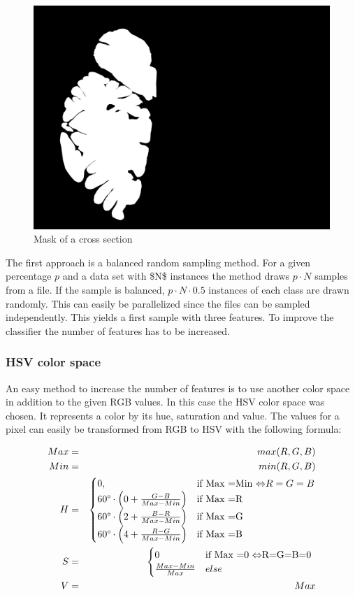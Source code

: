 \begin{figure}	
\centering 	
\includegraphics[width=0.6\linewidth]{graphics/mask603} 	
\caption{Mask of a cross section} 	
\label{fig:mask603} 
\end{figure}

The first approach is a balanced random sampling method. For a given
percentage $p$ and a data set with \$N\$ instances the method draws
$p\cdot N$ samples from a file. If the sample is balanced, $p\cdot N\cdot0.5$
instances of each class are drawn randomly. This can easily be parallelized
since the files can be sampled independently. This yields a first
sample with three features. To improve the classifier the number of
features has to be increased.


\subsubsection{HSV color space}

An easy method to increase the number of features is to use another
color space in addition to the given RGB values. In this case the
HSV color space was chosen. It represents a color by its hue, saturation
and value. The values for a pixel can easily be transformed from RGB
to HSV with the following formula:

\begin{eqnarray*}
Max & = & max(R,G,B)\\
Min & = & min(R,G,B)\\
H & = & \begin{cases}
0, & \text{if Max =Min \ensuremath{\Leftrightarrow}}R=G=B\\
60\text{\textdegree}\cdot\left(0+\frac{G-B}{Max-Min}\right) & \text{if Max =R }\\
60\text{\textdegree}\cdot\left(2+\frac{B-R}{Max-Min}\right) & \text{if Max =G}\\
60\text{\textdegree}\cdot\left(4+\frac{R-G}{Max-Min}\right) & \text{if Max =B}
\end{cases}\\
S & = & \begin{cases}
0 & \text{if Max =0 \ensuremath{\Leftrightarrow}R=G=B=0 }\\
\frac{Max-Min}{Max} & else
\end{cases}\\
V & = & Max
\end{eqnarray*}


